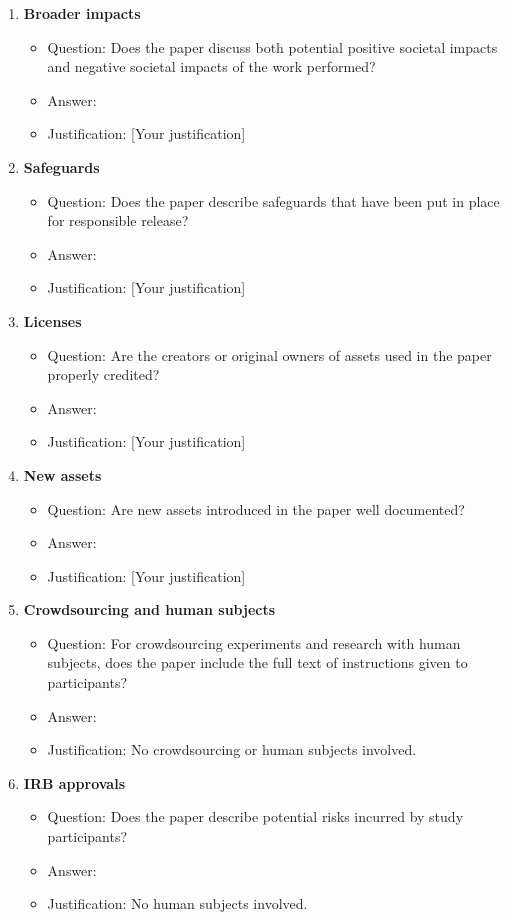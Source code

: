 \documentclass{article}
\begin{document}
\begin{enumerate}
  \item \textbf{Broader impacts}
  \begin{itemize}
    \item Question: Does the paper discuss both potential positive societal impacts and negative societal impacts of the work performed?
    \item Answer: \answerYes{}
    \item Justification: [Your justification]
  \end{itemize}

  \item \textbf{Safeguards}
  \begin{itemize}
    \item Question: Does the paper describe safeguards that have been put in place for responsible release?
    \item Answer: \answerNA{}
    \item Justification: [Your justification]
  \end{itemize}

  \item \textbf{Licenses}
  \begin{itemize}
    \item Question: Are the creators or original owners of assets used in the paper properly credited?
    \item Answer: \answerYes{}
    \item Justification: [Your justification]
  \end{itemize}

  \item \textbf{New assets}
  \begin{itemize}
    \item Question: Are new assets introduced in the paper well documented?
    \item Answer: \answerNA{}
    \item Justification: [Your justification]
  \end{itemize}

  \item \textbf{Crowdsourcing and human subjects}
  \begin{itemize}
    \item Question: For crowdsourcing experiments and research with human subjects, does the paper include the full text of instructions given to participants?
    \item Answer: \answerNA{}
    \item Justification: No crowdsourcing or human subjects involved.
  \end{itemize}

  \item \textbf{IRB approvals}
  \begin{itemize}
    \item Question: Does the paper describe potential risks incurred by study participants?
    \item Answer: \answerNA{}
    \item Justification: No human subjects involved.
  \end{itemize}
\end{enumerate}
\end{document}
